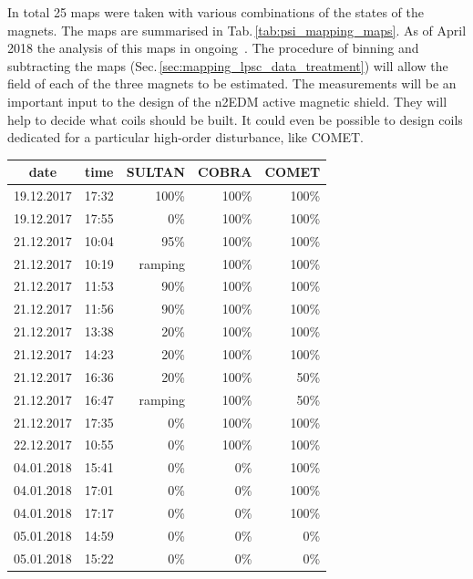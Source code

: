 In total 25 maps were taken with various combinations of the states of the magnets. The maps are summarised in Tab.\,\ref{tab:psi_mapping_maps}.
As of April 2018 the analysis of this maps in ongoing~\cite{EmmeneggerThesis}.
The procedure of binning and subtracting the maps (Sec.\,\ref{sec:mapping_lpsc_data_treatment}) will allow the field of each of the three magnets to be estimated. The measurements will be an important input to the design of the n2EDM active magnetic shield. They will help to decide what coils should be built. It could even be possible to design coils dedicated for a particular high-order disturbance, like COMET\@.

\begin{table}
  \centering
  \begin{tabular}{ccrrr}
    date        &  time   &  SULTAN   &  COBRA  &  COMET \\ \midrule
    19.12.2017  &  17:32  &  100\%    &  100\%  &  100\%  \\
    19.12.2017  &  17:55  &  0\%      &  100\%  &  100\%  \\
    21.12.2017  &  10:04  &  95\%     &  100\%  &  100\%  \\
    21.12.2017  &  10:19  &  ramping  &  100\%  &  100\%  \\
    21.12.2017  &  11:53  &  90\%     &  100\%  &  100\%  \\
    21.12.2017  &  11:56  &  90\%     &  100\%  &  100\%  \\
    21.12.2017  &  13:38  &  20\%     &  100\%  &  100\%  \\
    21.12.2017  &  14:23  &  20\%     &  100\%  &  100\%  \\
    21.12.2017  &  16:36  &  20\%     &  100\%  &  50\%   \\
    21.12.2017  &  16:47  &  ramping  &  100\%  &  50\%   \\
    21.12.2017  &  17:35  &  0\%      &  100\%  &  100\%  \\
    22.12.2017  &  10:55  &  0\%      &  100\%  &  100\%  \\
    04.01.2018  &  15:41  &  0\%      &  0\%    &  100\%  \\
    04.01.2018  &  17:01  &  0\%      &  0\%    &  100\%  \\
    04.01.2018  &  17:17  &  0\%      &  0\%    &  100\%  \\
    05.01.2018  &  14:59  &  0\%      &  0\%    &  0\%    \\
    05.01.2018  &  15:22  &  0\%      &  0\%    &  0\%    \\

\end{tabular}
\end{table}
